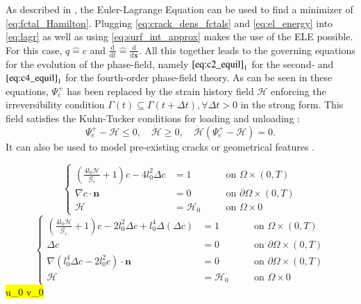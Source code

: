 As described in , the Euler-Lagrange Equation can be used to find a minimizer of \eqref{eq:fctal_Hamilton}. Plugging \eqref{eq:crack_dens_fctals} and \eqref{eq:el_energy} into \eqref{eq:lagr} as well as using \eqref{eq:surf_int_approx} makes the use of the ELE possible. For this case, $q\hat{=}c$ and $\frac{\mathrm{d}}{\mathrm{d}t}\hat{=}\frac{\mathrm{d}}{\mathrm{d}\mathbf{x}}$. All this together leads to the governing equations for the evolution of the phase-field, namely $\eqref{eq:c2_equil}_{1}$ for the second- and $\eqref{eq:c4_equil}_{1}$ for the fourth-order phase-field theory. As can be seen in these equations, $\Psi_{e}^{+}$ has been replaced by the strain history field $\mathcal{H}$ enforcing the irreversibility condition $\Gamma\left(t\right)\subseteq\Gamma\left(t+\Delta t\right), \forall \Delta t>0$ in the strong form. This field satisfies the Kuhn-Tucker conditions for loading and unloading \cite{01_PF_dyn_brittle}:
\begin{equation} \label{eq:KuhnTucker}
	\Psi_{e}^{+}-\mathcal{H}\leq0, \quad \dot{\mathcal{H}}\geq0, \quad \dot{\mathcal{H}}\left(\Psi_{e}^{+}-\mathcal{H}\right)=0.
\end{equation}
It can also be used to model pre-existing cracks or geometrical features \cite{01_PF_dyn_brittle}.

\begin{equation} \label{eq:c2_equil}
		 \left\{\begin{alignedat}{2}
\left(\frac{4l_{0}\mathcal{H}}{\mathcal{G}_{c}}+1\right)c - 4l_{0}^{2}\Delta c &= 1 && \quad\text{on } \Omega\times\left(0,T\right) \\
\nabla c\cdot\mathbf{n} &= 0 && \quad \text{on } \partial\Omega\times\left(0,T\right) \\
\mathcal{H} &= \mathcal{H}_{0} && \quad \text{on } \Omega\times0  
\end{alignedat}\right.
\end{equation}
\begin{equation} \label{eq:c4_equil}
		 \left\{\begin{alignedat}{2}
\left(\frac{4l_{0}\mathcal{H}}{\mathcal{G}_{c}}+1\right)c - 2l_{0}^{2}\Delta c + l_{0}^{4}\Delta\left(\Delta c\right) &= 1 && \quad\text{on } \Omega\times\left(0,T\right) \\
\Delta c &= 0 && \quad \text{on } \partial\Omega\times\left(0,T\right) \\
\nabla\left(l_{0}^{4}\Delta c-2l_{0}^{2}c\right)\cdot\mathbf{n} &= 0 && \quad \text{on } \partial\Omega\times\left(0,T\right) \\
\mathcal{H} &= \mathcal{H}_{0} && \quad \text{on } \Omega\times0  
\end{alignedat}\right.
\end{equation}
\hl{ u_{0} \text{ } v_{0} }

